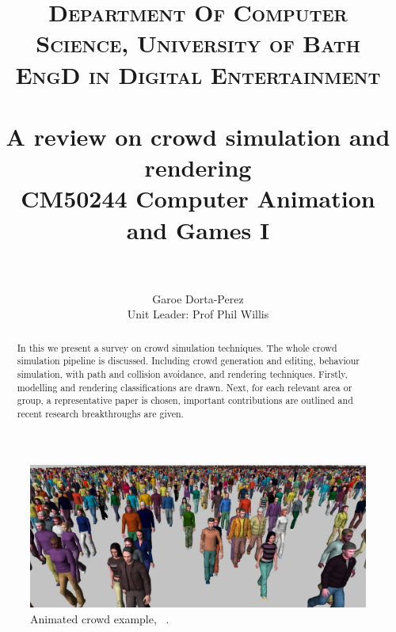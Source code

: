 \documentclass[6pt]{article} %
\title{	
\normalfont \normalsize 
\textsc{Department Of Computer Science, University of Bath} \\ [5pt] %
\textsc{EngD in Digital Entertainment} \\ [5pt] 
\horrule{0.7pt} \\[0.2cm] %
\Huge A review on crowd simulation and rendering \\ %
\vspace{7 mm}
\Large CM50244 \: Computer Animation and Games I \\
\horrule{0.7pt} \\[0.0cm] %
}
\author{Garoe Dorta-Perez \\ \Large Unit Leader: Prof Phil Willis \\}  %
\begin{document}
\vspace*{\fill}
\begin{center}
	\begin{minipage}{1.0\textwidth}
		\maketitle %
		\thispagestyle{empty}
	\end{minipage}
\end{center}



\vfill %
\begin{abstract}
\normalsize %
In this we present a survey on crowd simulation techniques.
The whole crowd simulation pipeline is discussed.
Including crowd generation and editing, behaviour simulation, with path and collision avoidance, and rendering techniques.
Firstly, modelling and rendering classifications are drawn.
Next, for each relevant area or group, a representative paper is chosen, important contributions are outlined and recent research breakthroughs are given.
\end{abstract}
\vfill %

\clearpage %



\begin{figure}
		\centering
		\includegraphics[scale=0.3]{images/crowd2}
		\caption{Animated crowd example, ~\cite{ruiz2013}.}
\end{figure}
\end{document}
